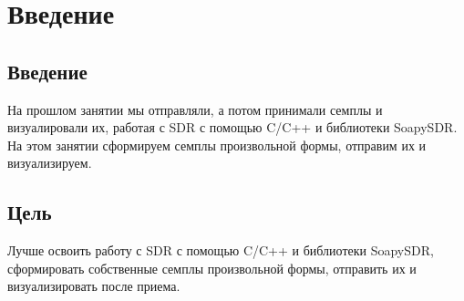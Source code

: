 \chapter{Введение}

\section{Введение}
На прошлом занятии мы отправляли, а потом принимали семплы и визуалировали их, работая с SDR с помощью C/C++ и библиотеки
SoapySDR. На этом занятии сформируем семплы произвольной формы, отправим их и визуализируем.  

\section{Цель}
Лучше освоить работу с SDR с помощью C/C++ и библиотеки SoapySDR, сформировать собственные семплы произвольной формы, отправить их
и визуализировать после приема.

\endinput